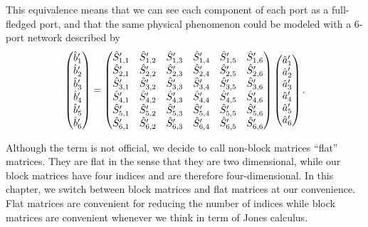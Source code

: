 This equivalence means that we can see each component of each port as a full-fledged port, and that the same physical phenomenon could be modeled with a 6-port network described by
\begin{equation}
    \begin{pmatrix}
        \hat{b}'_1 \\ \hat{b}'_2 \\ \hat{b}'_3 \\ \hat{b}'_{4} \\ \hat{b}'_{5} \\ \hat{b}'_{6}
    \end{pmatrix}
    =
    \begin{pmatrix}
        \hat{S}'_{1, 1} & \hat{S}'_{1, 2} & \hat{S}'_{1, 3} & \hat{S}'_{1, 4} & \hat{S}'_{1, 5} & \hat{S}'_{1, 6} \\
        \hat{S}'_{2, 1} & \hat{S}'_{2, 2} & \hat{S}'_{2, 3} & \hat{S}'_{2, 4} & \hat{S}'_{2, 5} & \hat{S}'_{2, 6} \\
        \hat{S}'_{3, 1} & \hat{S}'_{3, 2} & \hat{S}'_{3, 3} & \hat{S}'_{3, 4} & \hat{S}'_{3, 5} & \hat{S}'_{3, 6} \\
        \hat{S}'_{4, 1} & \hat{S}'_{4, 2} & \hat{S}'_{4, 3} & \hat{S}'_{4, 4} & \hat{S}'_{4, 5} & \hat{S}'_{4, 6} \\
        \hat{S}'_{5, 1} & \hat{S}'_{5, 2} & \hat{S}'_{5, 3} & \hat{S}'_{5, 4} & \hat{S}'_{5, 5} & \hat{S}'_{5, 6} \\
        \hat{S}'_{6, 1} & \hat{S}'_{6, 2} & \hat{S}'_{6, 3} & \hat{S}'_{6, 4} & \hat{S}'_{6, 5} & \hat{S}'_{6, 6}
    \end{pmatrix}
    \begin{pmatrix}
        \hat{a}'_1 \\ \hat{a}'_2 \\ \hat{a}'_3 \\ \hat{a}'_{4} \\ \hat{a}'_{5} \\ \hat{a}'_{6}
    \end{pmatrix}
    \text{.}
    \label{eq:matrix_totally_flattenned}
\end{equation}

Although the term is not official, we decide to call non-block matrices ``flat'' matrices.
They are flat in the sense that they are two dimensional, while our block matrices have four indices and are therefore four-dimensional.
In this chapter, we switch between block matrices and flat matrices at our convenience.
Flat matrices are convenient for reducing the number of indices while block matrices are convenient whenever we think in term of Jones calculus.


